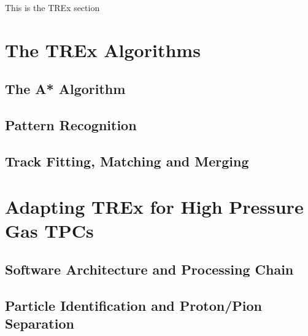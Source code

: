 This is the TREx section
\section{The TREx Algorithms}
\subsection{The A* Algorithm}
\subsection{Pattern Recognition}
\subsection{Track Fitting, Matching and Merging}
\section{Adapting TREx for High Pressure Gas TPCs}
\subsection{Software Architecture and Processing Chain}
\subsection{Particle Identification and Proton/Pion Separation}